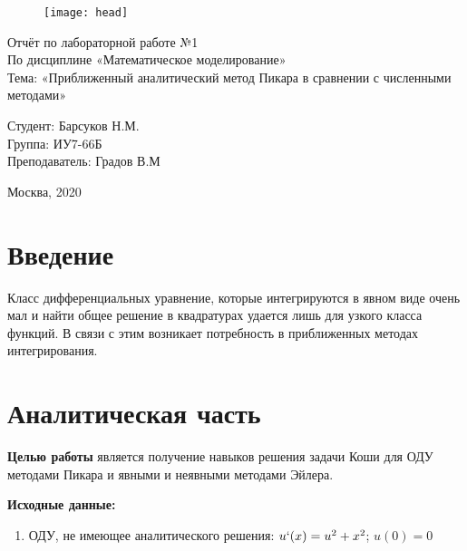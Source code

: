 \documentclass[12pt,a4paper]{scrartcl}
\begin{document}
\begin{titlepage}
\newpage
\begin{figure}[H]
	\centering
	\texttt{[image: head]}
\end{figure}

\vspace{5cm}
\begin{center}
\Large Отчёт по лабораторной работе №1 \\ По дисциплине «Математическое моделирование» \\ Тема: «Приближенный аналитический метод Пикара в сравнении с численными методами» 
\end{center}

\vspace{6em}
\begin{flushright}
Студент: \hrulefill Барсуков Н.М. \\
\vspace{1.5em}
Группа: \hrulefill ИУ7-66Б\\
\vspace{1.5em}
Преподаватель: \hrulefill Градов В.М\\
\vspace{1.5em}
\end{flushright}
\vspace{\fill}
\begin{center}
Москва, 2020
\end{center}
\end{titlepage}

\newpage
\tableofcontents

\newpage
\section{Введение}
	Класс дифференциальных уравнение, которые интегрируются в явном виде очень мал и найти общее решение в квадратурах удается лишь для узкого класса функций. 
	В связи с этим возникает потребность в приближенных методах интегрирования.
	
\section {Аналитическая часть} 

	\textbf{Целью работы} является получение навыков решения задачи Коши для ОДУ методами Пикара и явными и неявными методами Эйлера.
	
	\textbf{Исходные данные:}
	\begin{enumerate}
		\item ОДУ, не имеющее аналитического решения: \newline$u`(x) = u^2 + x^2$; \newline$u(0) = 0$
	\end{enumerate}
	
\end{document}
